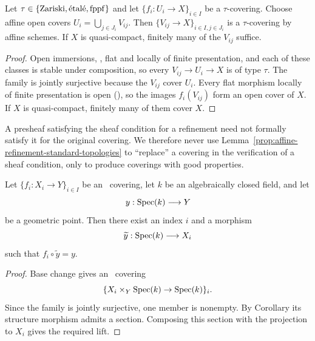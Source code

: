 \begin{lemma}\label{prop:affine-refinement-standard-topologies}
	Let $\tau\in\{\mathrm{Zariski}, \text{\'etal\'e}, \mathrm{fppf}\}$ and let $\{f_i:U_i\to X\}_{i\in I}$ be a $\tau$-covering. Choose affine open covers $U_i=\bigcup_{j\in J_i}V_{ij}$. Then $\{V_{ij}\to X\}_{i\in I, j\in J_i}$ is a $\tau$-covering by affine schemes. If $X$ is quasi-compact, finitely many of the $V_{ij}$ suffice.
\end{lemma}

\begin{proof}
	Open immersions, \etale, flat and locally of finite presentation, and each of these classes is stable under composition, so every $V_{ij}\to U_i\to X$ is of type $\tau$. The family is jointly surjective because the $V_{ij}$ cover $U_i$. Every flat morphism locally of finite presentation is open (\cite[][Tag 01UA]{stacks-project}), so the images $f_i(V_{ij})$ form an open cover of $X$. If $X$ is quasi-compact, finitely many of them cover $X$.
\end{proof}

\begin{remark}
	A presheaf satisfying the sheaf condition for a refinement need not formally satisfy it for the original covering. We therefore never use Lemma~\ref{prop:affine-refinement-standard-topologies} to ``replace'' a covering in the verification of a sheaf condition, only to produce coverings with good properties.
\end{remark}


\begin{lemma}
	\label{lem:scheme-geometric-points-etale-cover}
	Let $\{f_i:X_i\to Y\}_{i\in I}$ be an \etale\
	covering, let $k$ be an algebraically closed field,
	and let
	\[
	y:\operatorname{Spec}\!\left(k\right)\longrightarrow Y
	\]
	be a geometric point.
	Then there exist an index $i$ and a morphism
	\[
	\widetilde{y}:\operatorname{Spec}\!\left(k\right)\longrightarrow X_i
	\]
	such that $f_i\circ\widetilde{y}=y$.
\end{lemma}

\begin{proof}
	Base change gives an \etale\ covering
	\[
	\{X_i\times_Y\operatorname{Spec}\!\left(k\right)\to\operatorname{Spec}\!\left(k\right)\}_i.
	\]
	Since the family is jointly surjective, one
	member is nonempty.
	By Corollary %
	its structure morphism admits a section.
	Composing this section with the projection
	to $X_i$ gives the required lift.
\end{proof}


